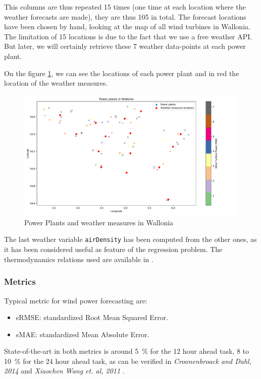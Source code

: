 \documentclass[a4paper, 12pt]{article}
\begin{document}
    This columns are thus repeated 15 times (one time at each location where the weather forecasts are made), they are thus 105 in total. The forecast locations have been chosen by hand, looking at the map of all wind turbines in Wallonia. The limitation of 15 locations is due to the fact that we use a free weather API. But later, we will certainly retrieve these 7 weather data-points at each power plant.
    
    On the figure \ref{fig:power_plants}, we can see the locations of each power plant and in red the location of the weather measures.

    \begin{figure}[h!]
        \centering
        \includegraphics[width=.85\textwidth]{resources/pdf/power_plants.pdf}
        \caption{Power Plants and weather measures in Wallonia}
        \label{fig:power_plants}
    \end{figure}
    
    The last weather variable \texttt{airDensity} has been computed from the other ones, as it has been considered useful as feature of the regression problem. The thermodynamics relations used are available in \cite{airdensity}.

    \subsubsection{Metrics}
    
    Typical metric for wind power forecasting are:
    \begin{itemize}
        \item sRMSE: standardized Root Mean Squared Error.
        \item sMAE: standardized Mean Absolute Error.
    \end{itemize}
    
    State-of-the-art in both metrics is around \SI{5}{\percent} for the 12 hour ahead task, 8 to \SI{10}{\percent} for the 24 hour ahead task, as can be verified in \emph{Croonenbroack and Dahl, 2014} \cite{croonenbroeck2014windpower} and \emph{Xiaochen Wang et. al, 2011} \cite{wang2011windpower}.
    
\end{document}
